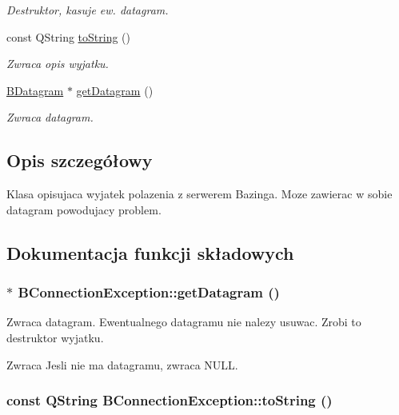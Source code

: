 \begin{DoxyCompactItemize}
\begin{DoxyCompactList}\small\item\em Destruktor, kasuje ew. datagram. \item\end{DoxyCompactList}\item 
const QString \hyperlink{class_b_connection_exception_a645db90a648e008820d2506a67aca2ec}{toString} ()
\begin{DoxyCompactList}\small\item\em Zwraca opis wyjatku. \item\end{DoxyCompactList}\item 
\hyperlink{class_b_datagram}{BDatagram} $\ast$ \hyperlink{class_b_connection_exception_a430b5f1f10ea49111da8ad333ec9344f}{getDatagram} ()
\begin{DoxyCompactList}\small\item\em Zwraca datagram. \item\end{DoxyCompactList}\end{DoxyCompactItemize}


\subsection{Opis szczegółowy}
Klasa opisujaca wyjatek polazenia z serwerem Bazinga. Moze zawierac w sobie datagram powodujacy problem. 

\subsection{Dokumentacja funkcji składowych}
\hypertarget{class_b_connection_exception_a430b5f1f10ea49111da8ad333ec9344f}{
\subsubsection[{getDatagram}]{ $\ast$ BConnectionException::getDatagram ()}}
\label{class_b_connection_exception_a430b5f1f10ea49111da8ad333ec9344f}


Zwraca datagram. Ewentualnego datagramu nie nalezy usuwac. Zrobi to destruktor wyjatku.

\begin{DoxyReturn}{Zwraca}
Jesli nie ma datagramu, zwraca NULL. 
\end{DoxyReturn}
\hypertarget{class_b_connection_exception_a645db90a648e008820d2506a67aca2ec}{
\subsubsection[{toString}]{\setlength{\rightskip}{0pt plus 5cm}const QString BConnectionException::toString ()}}
\label{class_b_connection_exception_a645db90a648e008820d2506a67aca2ec}


